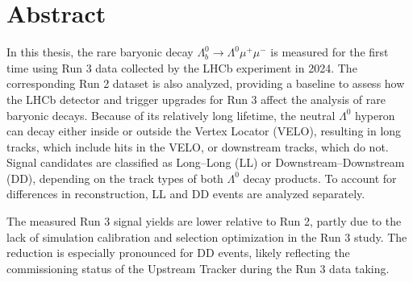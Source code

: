 \thispagestyle{plain}

\section*{Abstract}
In this thesis, the rare baryonic decay $\Lambda_b^0 \to \Lambda^0 \mu^+ \mu^-$ is measured for the first time using Run 3 data collected by the LHCb experiment in 2024. The corresponding Run 2 dataset is also analyzed, providing a baseline to assess how the LHCb detector and trigger upgrades for Run 3 affect the analysis of rare baryonic decays. Because of its relatively long lifetime, the neutral $\Lambda^0$ hyperon can decay either inside or outside the Vertex Locator (VELO), resulting in long tracks, which include hits in the VELO, or downstream tracks, which do not. Signal candidates are classified as Long--Long (LL) or Downstream--Downstream (DD), depending on the track types of both $\Lambda^0$ decay products. To account for differences in reconstruction, LL and DD events are analyzed separately. 

The measured Run 3 signal yields are lower relative to Run 2, partly due to the lack of simulation calibration and selection optimization in the Run 3 study. The reduction is especially pronounced for DD events, likely reflecting the commissioning status of the Upstream Tracker during the Run 3 data taking.

